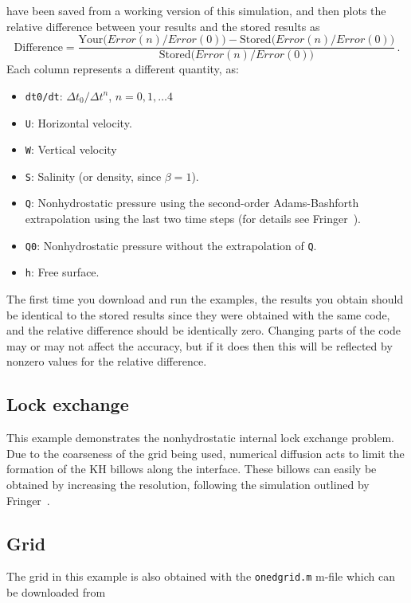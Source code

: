 \documentclass[12pt,oneside]{article}
\begin{document}
have been saved from a working version of this simulation, and then plots the relative
difference between your results and the stored results as
\[
\mbox{Difference} = \frac{\mbox{Your($Error(n)/Error(0)$)} - \mbox{Stored($Error(n)/Error(0)$)}}
{\mbox{Stored($Error(n)/Error(0)$)}}\,.
\]
Each column represents a different quantity, as:
\begin{itemize}
\item \verb+dt0/dt+: $\Delta t_0/\Delta t^n$, $n=0,1,\dots 4$
\item \verb+U+: Horizontal velocity.
\item \verb+W+: Vertical velocity
\item \verb+S+: Salinity (or density, since $\beta=1$).
\item \verb+Q+: Nonhydrostatic pressure using the second-order Adams-Bashforth extrapolation
using the last two time steps (for details see Fringer\etal~\cite{FRINGER[2005]}).
\item \verb+Q0+: Nonhydrostatic pressure without the extrapolation of \verb+Q+.
\item \verb+h+: Free surface.
\end{itemize}
The first time you download and run the examples, the results
you obtain should be identical to the stored results since they were obtained with the
same code, and the relative difference should be identically zero.  Changing parts of the
code may or may not affect the accuracy, but if it does then this will be reflected by
nonzero values for the relative difference.

\subsection{Lock exchange} \label{sec:lockexchange}

This example demonstrates the nonhydrostatic internal lock exchange problem.  Due to the
coarseness of the grid being used, numerical diffusion acts to limit the formation of
the KH billows along the interface.  These billows can easily be obtained by increasing
the resolution, following the simulation outlined by Fringer\etal~\cite{FRINGER[2005]}.

\subsection{Grid}

The grid in this example is also obtained with the 
\verb+onedgrid.m+ m-file which can be downloaded from 
\end{document}
